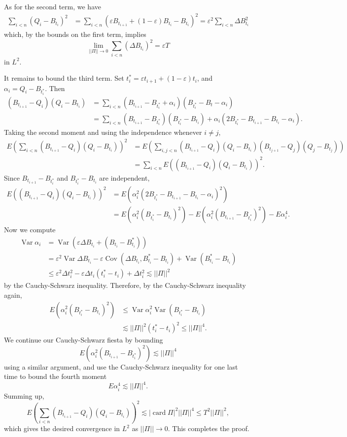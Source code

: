 \documentclass[10pt]{article}
\renewcommand{\epsilon}{\varepsilon}
\newcommand{\card}{\operatorname{card}}
\DeclareMathOperator{\Cov}{Cov}
\DeclareMathOperator{\Var}{Var}
\theoremstyle{definition}
\begin{document}
As for the second term, we have
\begin{align*}
\sum_{i < n} (Q_i - B_{t_i})^2 &= \sum_{i < n} (\varepsilon B_{t_{i+1}} + (1 - \varepsilon) B_{t_i} - B_{t_i})^2 = \varepsilon^2 \sum_{i < n} \Delta B_{t_i}^2
\end{align*}
which, by the bounds on the first term, implies
$$\lim_{||\Pi|| \to 0} \sum_{i < n} (\Delta B_{t_i})^2 = \varepsilon T$$
in $L^2$.

It remains to bound the third term. Set $t_i^* = \epsilon t_{i+1} + (1 - \epsilon) t_i$, and $\alpha_i = Q_i - B_{t_i^*}$.
Then
\begin{align*}
(B_{t_{i+1}} - Q_i)(Q_i - B_{t_i}) &= \sum_{i < n} (B_{t_{i+1}} - B_{t_i^*} + \alpha_i)(B_{t_i^*} - B_t - \alpha_i)\\
&= \sum_{i < n} (B_{t_{i+1}} - B_{t_i^*})(B_{t_i^*} - B_{t_i}) + \alpha_i(2B_{t_i^*} - B_{t_{i+1}} - B_{t_i} - \alpha_i).
\end{align*}
Taking the second moment and using the independence whenever $i \neq j$,
\begin{align*}
E\left(\sum_{i < n} (B_{t_{i+1}} - Q_i)(Q_i - B_{t_i})\right)^2 &= E\left(\sum_{i, j < n} (B_{t_{i+1}} - Q_i)(Q_i - B_{t_i})(B_{t_{j+1}} - Q_j)(Q_j - B_{t_j})\right)\\
&= \sum_{i < n} E((B_{t_{i+1}} - Q_i)(Q_i - B_{t_i}))^2.
\end{align*}
Since $B_{t_{i+1}} - B_{t_i^*}$ and $B_{t_i^*} - B_{t_i}$ are independent,
\begin{align*}
E((B_{t_{i+1}} - Q_i)(Q_i - B_{t_i}))^2 &= E(\alpha_i^2(2B_{t_i^*} - B_{t_{i+1}} - B_{t_i} - \alpha_i)^2)\\
&= E(\alpha_i^2(B_{t_i^*} - B_{t_i})^2) - E(\alpha_i^2(B_{t_{i+1}}- B_{t_i^*})^2) - E \alpha_i^4.
\end{align*}
Now we compute
\begin{align*}
\Var \alpha_i &= \Var(\epsilon \Delta B_{t_i} + (B_{t_i} - B_{t_i}^*))\\
&= \epsilon^2 \Var \Delta B_{t_i} - \epsilon \Cov(\Delta B_{t_i}, B_{t_i}^* - B_{t_i}) + \Var(B_{t_i}^* - B_{t_i})\\
&\leq \epsilon^2 \Delta t_i^2 - \epsilon \Delta t_i(t_i^* - t_i) + \Delta t_i^2 \lesssim ||\Pi||^2
\end{align*}
by the Cauchy-Schwarz inequality. Therefore, by the Cauchy-Schwarz inequality again,
\begin{align*}
E(\alpha_i^2(B_{t_i^*} - B_{t_i})^2) &\leq \Var \alpha_i^2 \Var(B_{t_i^*} - B_{t_i}) \\
&\lesssim ||\Pi||^2 (t_i^* - t_i)^2 \leq ||\Pi||^4.
\end{align*}
We continue our Cauchy-Schwarz fiesta by bounding
$$E(\alpha_i^2(B_{t_{i+1}}- B_{t_i^*})^2) \lesssim ||\Pi||^4$$
using a similar argument, and use the Cauchy-Schwarz inequality for one last time to bound the fourth moment
$$E\alpha_i^4 \lesssim ||\Pi||^4.$$
Summing up,
$$E\left(\sum_{i < n} (B_{t_{i+1}} - Q_i)(Q_i - B_{t_i})\right)^2 \lesssim |\card \Pi|^2 ||\Pi||^4 \leq T^2 ||\Pi||^2,$$
which gives the desired convergence in $L^2$ as $||\Pi|| \to 0$.
This completes the proof.
\end{document}
